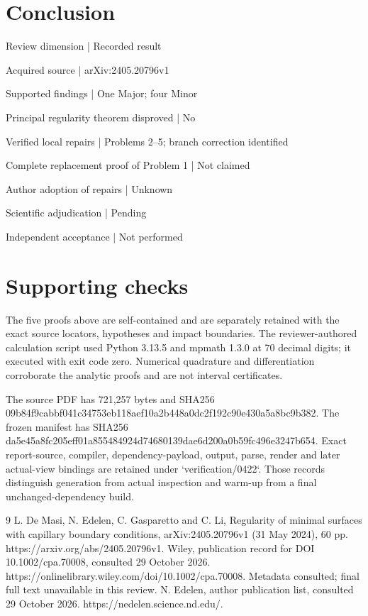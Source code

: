 \documentclass[10pt]{article}
\begin{document}
\section*{Conclusion}
Review dimension | Recorded result\par
Acquired source | arXiv:2405.20796v1\par
Supported findings | One Major; four Minor\par
Principal regularity theorem disproved | No\par
Verified local repairs | Problems 2–5; branch correction identified\par
Complete replacement proof of Problem 1 | Not claimed\par
Author adoption of repairs | Unknown\par
Scientific adjudication | Pending\par
Independent acceptance | Not performed\par
\section*{Supporting checks}
The five proofs above are self-contained and are separately retained with the exact source locators, hypotheses and impact boundaries. The reviewer-authored calculation script used Python 3.13.5 and mpmath 1.3.0 at 70 decimal digits; it executed with exit code zero. Numerical quadrature and differentiation corroborate the analytic proofs and are not interval certificates.\par
The source PDF has 721,257 bytes and SHA256 09b84f9cabbf041c34753eb118aef10a2b448a0dc2f192c90e430a5a8bc9b382. The frozen manifest has SHA256 da5e45a8fc205eff01a855484924d74680139dae6d200a0b59fc496e3247b654. Exact report-source, compiler, dependency-payload, output, parse, render and later actual-view bindings are retained under `verification/0422`. Those records distinguish generation from actual inspection and warm-up from a final unchanged-dependency build.\par
9 L. De Masi, N. Edelen, C. Gasparetto and C. Li, Regularity of minimal surfaces with capillary boundary conditions, arXiv:2405.20796v1 (31 May 2024), 60 pp. https://arxiv.org/abs/2405.20796v1. Wiley, publication record for DOI 10.1002/cpa.70008, consulted 29 October 2026. https://onlinelibrary.wiley.com/doi/10.1002/cpa.70008. Metadata consulted; final full text unavailable in this review. N. Edelen, author publication list, consulted 29 October 2026. https://nedelen.science.nd.edu/.\par
\end{document}
